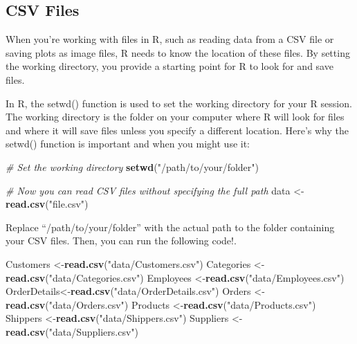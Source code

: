 \documentclass[
]{book}
\newenvironment{Shaded}{\begin{snugshade}}{\end{snugshade}}
\newcommand{\CommentTok}[1]{\textcolor[rgb]{0.56,0.35,0.01}{\textit{#1}}}
\newcommand{\FunctionTok}[1]{\textcolor[rgb]{0.13,0.29,0.53}{\textbf{#1}}}
\newcommand{\NormalTok}[1]{#1}
\newcommand{\OtherTok}[1]{\textcolor[rgb]{0.56,0.35,0.01}{#1}}
\newcommand{\StringTok}[1]{\textcolor[rgb]{0.31,0.60,0.02}{#1}}
\begin{document}
\hypertarget{csv-files}{%
\subsection{CSV Files}\label{csv-files}}

When you're working with files in R, such as reading data from a CSV file or saving plots as image files, R needs to know the location of these files. By setting the working directory, you provide a starting point for R to look for and save files.

In R, the setwd() function is used to set the working directory for your R session. The working directory is the folder on your computer where R will look for files and where it will save files unless you specify a different location. Here's why the setwd() function is important and when you might use it:

\begin{Shaded}
\begin{Highlighting}[]
\CommentTok{\# Set the working directory}
\FunctionTok{setwd}\NormalTok{(}\StringTok{"/path/to/your/folder"}\NormalTok{)}
\end{Highlighting}
\end{Shaded}

\begin{Shaded}
\begin{Highlighting}[]
\CommentTok{\# Now you can read CSV files without specifying the full path}
\NormalTok{data }\OtherTok{\textless{}{-}} \FunctionTok{read.csv}\NormalTok{(}\StringTok{"file.csv"}\NormalTok{)}
\end{Highlighting}
\end{Shaded}

Replace ``/path/to/your/folder'' with the actual path to the folder containing your CSV files. Then, you can run the following code!.

\begin{Shaded}
\begin{Highlighting}[]
\NormalTok{Customers   }\OtherTok{\textless{}{-}}\FunctionTok{read.csv}\NormalTok{(}\StringTok{"data/Customers.csv"}\NormalTok{)}
\NormalTok{Categories  }\OtherTok{\textless{}{-}}\FunctionTok{read.csv}\NormalTok{(}\StringTok{"data/Categories.csv"}\NormalTok{)  }
\NormalTok{Employees   }\OtherTok{\textless{}{-}}\FunctionTok{read.csv}\NormalTok{(}\StringTok{"data/Employees.csv"}\NormalTok{)  }
\NormalTok{OrderDetails}\OtherTok{\textless{}{-}}\FunctionTok{read.csv}\NormalTok{(}\StringTok{"data/OrderDetails.csv"}\NormalTok{)  }
\NormalTok{Orders      }\OtherTok{\textless{}{-}}\FunctionTok{read.csv}\NormalTok{(}\StringTok{"data/Orders.csv"}\NormalTok{)  }
\NormalTok{Products    }\OtherTok{\textless{}{-}}\FunctionTok{read.csv}\NormalTok{(}\StringTok{"data/Products.csv"}\NormalTok{)  }
\NormalTok{Shippers    }\OtherTok{\textless{}{-}}\FunctionTok{read.csv}\NormalTok{(}\StringTok{"data/Shippers.csv"}\NormalTok{)}
\NormalTok{Suppliers   }\OtherTok{\textless{}{-}}\FunctionTok{read.csv}\NormalTok{(}\StringTok{"data/Suppliers.csv"}\NormalTok{)  }
\end{Highlighting}
\end{Shaded}
\end{document}
